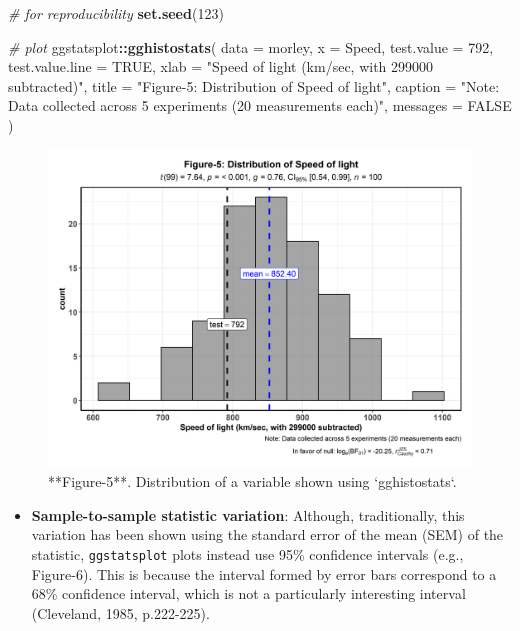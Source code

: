 \documentclass[]{article}
\newenvironment{Shaded}{\begin{snugshade}}{\end{snugshade}}
\newcommand{\CommentTok}[1]{\textcolor[rgb]{0.56,0.35,0.01}{\textit{#1}}}
\newcommand{\DataTypeTok}[1]{\textcolor[rgb]{0.13,0.29,0.53}{#1}}
\newcommand{\DecValTok}[1]{\textcolor[rgb]{0.00,0.00,0.81}{#1}}
\newcommand{\KeywordTok}[1]{\textcolor[rgb]{0.13,0.29,0.53}{\textbf{#1}}}
\newcommand{\NormalTok}[1]{#1}
\newcommand{\OperatorTok}[1]{\textcolor[rgb]{0.81,0.36,0.00}{\textbf{#1}}}
\newcommand{\OtherTok}[1]{\textcolor[rgb]{0.56,0.35,0.01}{#1}}
\newcommand{\StringTok}[1]{\textcolor[rgb]{0.31,0.60,0.02}{#1}}
\providecommand{\tightlist}{%
  \setlength{\itemsep}{0pt}\setlength{\parskip}{0pt}}
\begin{document}
\begin{Shaded}
\begin{Highlighting}[]
\CommentTok{# for reproducibility}
\KeywordTok{set.seed}\NormalTok{(}\DecValTok{123}\NormalTok{)}

\CommentTok{# plot}
\NormalTok{ggstatsplot}\OperatorTok{::}\KeywordTok{gghistostats}\NormalTok{(}
  \DataTypeTok{data =}\NormalTok{ morley,}
  \DataTypeTok{x =}\NormalTok{ Speed,}
  \DataTypeTok{test.value =} \DecValTok{792}\NormalTok{,}
  \DataTypeTok{test.value.line =} \OtherTok{TRUE}\NormalTok{,}
  \DataTypeTok{xlab =} \StringTok{"Speed of light (km/sec, with 299000 subtracted)"}\NormalTok{,}
  \DataTypeTok{title =} \StringTok{"Figure-5: Distribution of Speed of light"}\NormalTok{,}
  \DataTypeTok{caption =} \StringTok{"Note: Data collected across 5 experiments (20 measurements each)"}\NormalTok{,}
  \DataTypeTok{messages =} \OtherTok{FALSE}
\NormalTok{)}
\end{Highlighting}
\end{Shaded}

\begin{figure}
\includegraphics[width=1\linewidth]{./figures/paper-example5-1} \caption{**Figure-5**. Distribution of a variable shown using `gghistostats`.}\label{fig:example5}
\end{figure}

\begin{itemize}
\tightlist
\item
  \textbf{Sample-to-sample statistic variation}: Although,
  traditionally, this variation has been shown using the standard error
  of the mean (SEM) of the statistic, \texttt{ggstatsplot} plots instead
  use 95\% confidence intervals (e.g., Figure-6). This is because the
  interval formed by error bars correspond to a 68\% confidence
  interval, which is not a particularly interesting interval (Cleveland,
  1985, p.222-225).
\end{itemize}
\end{document}
